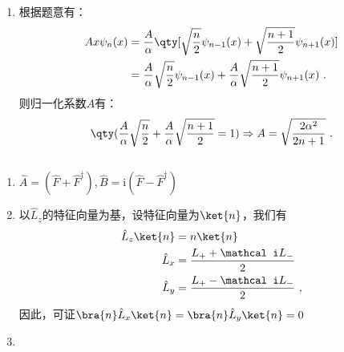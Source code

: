 
\begin{issues}
\issueDraft
\end{issues}

\subsection{ }
\begin{enumerate}
\item 根据题意有：
\begin{equation}
\begin{aligned}
Ax\psi_n(x)&=\frac{A}{\alpha}\qty[\sqrt{\frac{n}{2}}\psi_{n-1}(x)+\sqrt{\frac{n+1}{2}}\psi_{n+1}(x)] \\
&=\frac{A}{\alpha}\sqrt{\frac{n}{2}}\psi_{n-1}(x)+\frac{A}{\alpha}\sqrt{\frac{n+1}{2}}\psi_{n+1}(x)~.
\end{aligned}
\end{equation}
则归一化系数$A$有：
\begin{equation}
\qty(\frac{A}{\alpha}\sqrt{\frac{n}{2}}+\frac{A}{\alpha}\sqrt{\frac{n+1}{2}}=1)\Rightarrow A=\sqrt{\frac{2\alpha^2}{2n+1}}~.
\end{equation}
\end{enumerate}
\subsection{ }
\begin{enumerate}
\item $\hat A=(\hat F+\hat F^\dagger),\hat B=\mathrm i(\hat F-\hat F^\dagger)$
\item 以$\hat L_z$的特征向量为基，设特征向量为$\ket{n}$，我们有
\begin{equation}
\begin{aligned}
\hat L_z \ket{n}&=n\ket{n}\\
\hat L_x&=\frac{L_+ + \mathcal i L_-}{2}\\
\hat L_y&=\frac{L_+ -\mathcal i  L_-}{2}~,
\end{aligned}
\end{equation}
因此，可证$\bra{n}\hat L_x\ket{n}=\bra{n}\hat L_y\ket{n}=0$
\item 
\end{enumerate}
\subsection{ }
\subsection{ }
\subsection{ }
